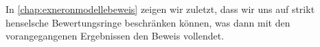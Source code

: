 \documentclass[german, bibliography=totoc]{scrreprt}
\begin{document}
In \autoref{chap:exneronmodellebeweis} zeigen wir zuletzt, dass wir
uns auf strikt henselsche Bewertungsringe beschränken können, was dann
mit den vorangegangenen Ergebnissen den Beweis vollendet.


\end{document}
